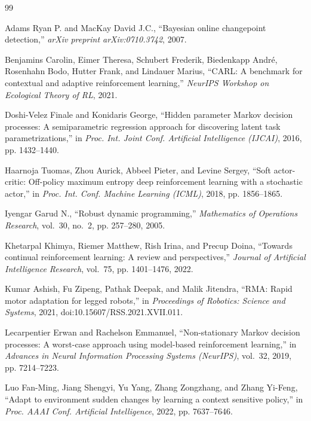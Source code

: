 \begin{thebibliography}{99}

{Adams Ryan P.} and {MacKay David J.C.}, ``Bayesian online changepoint detection,'' \emph{arXiv preprint arXiv:0710.3742}, 2007.

{Benjamins Carolin}, {Eimer Theresa}, {Schubert Frederik}, {Biedenkapp Andr\'e}, {Rosenhahn Bodo}, {Hutter Frank}, and {Lindauer Marius}, ``CARL: A benchmark for contextual and adaptive reinforcement learning,'' \emph{NeurIPS Workshop on Ecological Theory of RL}, 2021.

{Doshi-Velez Finale} and {Konidaris George}, ``Hidden parameter Markov decision processes: A semiparametric regression approach for discovering latent task parametrizations,'' in \emph{Proc. Int. Joint Conf. Artificial Intelligence (IJCAI)}, 2016, pp. 1432--1440.

{Haarnoja Tuomas}, {Zhou Aurick}, {Abbeel Pieter}, and {Levine Sergey}, ``Soft actor-critic: Off-policy maximum entropy deep reinforcement learning with a stochastic actor,'' in \emph{Proc. Int. Conf. Machine Learning (ICML)}, 2018, pp. 1856--1865.

{Iyengar Garud N.}, ``Robust dynamic programming,'' \emph{Mathematics of Operations Research}, vol.~30, no.~2, pp. 257--280, 2005.

{Khetarpal Khimya}, {Riemer Matthew}, {Rish Irina}, and {Precup Doina}, ``Towards continual reinforcement learning: A review and perspectives,'' \emph{Journal of Artificial Intelligence Research}, vol.~75, pp. 1401--1476, 2022.

{Kumar Ashish}, {Fu Zipeng}, {Pathak Deepak}, and {Malik Jitendra}, ``RMA: Rapid motor adaptation for legged robots,'' in \emph{Proceedings of Robotics: Science and Systems}, 2021, doi:10.15607/RSS.2021.XVII.011.

{Lecarpentier Erwan} and {Rachelson Emmanuel}, ``Non-stationary Markov decision processes: A worst-case approach using model-based reinforcement learning,'' in \emph{Advances in Neural Information Processing Systems (NeurIPS)}, vol.~32, 2019, pp. 7214--7223.

{Luo Fan-Ming}, {Jiang Shengyi}, {Yu Yang}, {Zhang Zongzhang}, and {Zhang Yi-Feng}, ``Adapt to environment sudden changes by learning a context sensitive policy,'' in \emph{Proc. AAAI Conf. Artificial Intelligence}, 2022, pp. 7637--7646.


\end{thebibliography}
